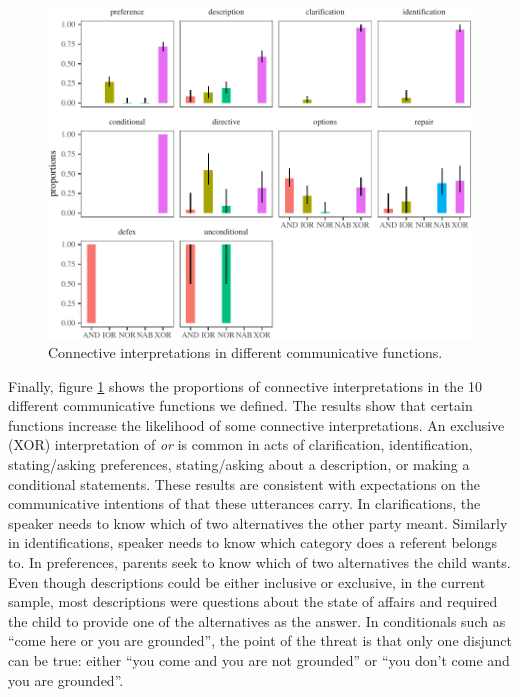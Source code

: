 \documentclass[,man,floatsintext]{apa6}
\begin{document}
\begin{figure}[tb]

{\centering \includegraphics{figs/speechActPlot-1} 

}

\caption{Connective interpretations in different communicative functions.}\label{fig:speechActPlot}
\end{figure}

Finally, figure \ref{fig:speechActPlot} shows the proportions of connective interpretations in the 10 different communicative functions we defined. The results show that certain functions increase the likelihood of some connective interpretations. An exclusive (XOR) interpretation of \emph{or} is common in acts of clarification, identification, stating/asking preferences, stating/asking about a description, or making a conditional statements. These results are consistent with expectations on the communicative intentions of that these utterances carry. In clarifications, the speaker needs to know which of two alternatives the other party meant. Similarly in identifications, speaker needs to know which category does a referent belongs to. In preferences, parents seek to know which of two alternatives the child wants. Even though descriptions could be either inclusive or exclusive, in the current sample, most descriptions were questions about the state of affairs and required the child to provide one of the alternatives as the answer. In conditionals such as \enquote{come here or you are grounded}, the point of the threat is that only one disjunct can be true: either \enquote{you come and you are not grounded} or \enquote{you don't come and you are grounded}.
\end{document}
